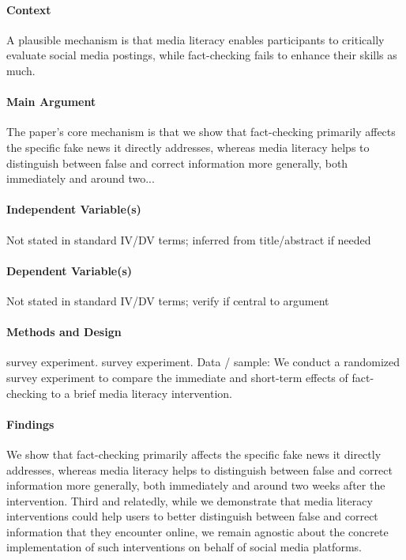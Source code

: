 \documentclass[12pt]{article}
\begin{document}
\paragraph{Context} A plausible mechanism is that media literacy enables participants to critically evaluate social media postings, while fact-checking fails to enhance their skills as much.

\paragraph{Main Argument} The paper's core mechanism is that we show that fact-checking primarily affects the specific fake news it directly addresses, whereas media literacy helps to distinguish between false and correct information more generally, both immediately and around two...

\paragraph{Independent Variable(s)} Not stated in standard IV/DV terms; inferred from title/abstract if needed

\paragraph{Dependent Variable(s)} Not stated in standard IV/DV terms; verify if central to argument

\paragraph{Methods and Design} survey experiment. survey experiment. Data / sample: We conduct a randomized survey experiment to compare the immediate and short-term effects of fact-checking to a brief media literacy intervention.

\paragraph{Findings} We show that fact-checking primarily affects the specific fake news it directly addresses, whereas media literacy helps to distinguish between false and correct information more generally, both immediately and around two weeks after the intervention. Third and relatedly, while we demonstrate that media literacy interventions could help users to better distinguish between false and correct information that they encounter online, we remain agnostic about the concrete implementation of such interventions on behalf of social media platforms.
\end{document}
